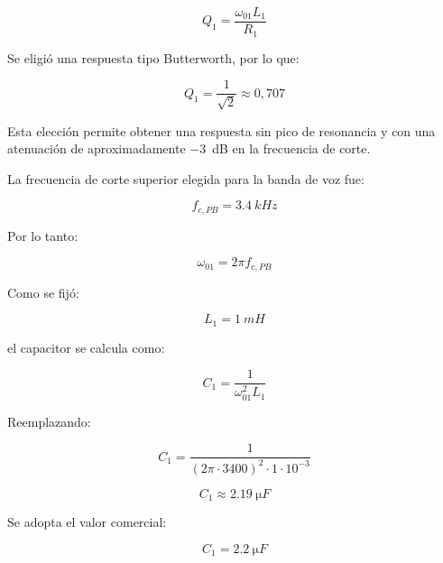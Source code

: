 \documentclass[12pt,a4paper]{article}
\begin{document}
\begin{equation}
    \boxed{
    Q_1=\frac{\omega_{01}L_1}{R_1}
    }
    \label{eq:q1}
\end{equation}

Se eligió una respuesta tipo Butterworth, por lo que:

\begin{equation}
    Q_1=\frac{1}{\sqrt{2}}\approx 0{,}707
    \label{eq:q_butterworth_pb}
\end{equation}

Esta elección permite obtener una respuesta sin pico de resonancia y con una atenuación de aproximadamente \SI{-3}{dB} en la frecuencia de corte.

La frecuencia de corte superior elegida para la banda de voz fue:

\begin{equation}
    f_{c,PB}=\SI{3.4}{kHz}
    \label{eq:fc_pb}
\end{equation}

Por lo tanto:

\begin{equation}
    \omega_{01}=2\pi f_{c,PB}
    \label{eq:w01_fc}
\end{equation}

Como se fijó:

\begin{equation}
    L_1=\SI{1}{mH}
    \label{eq:l1_valor}
\end{equation}

el capacitor se calcula como:

\begin{equation}
    C_1=
    \frac{1}{\omega_{01}^2L_1}
    \label{eq:c1_calculo}
\end{equation}

Reemplazando:

\begin{equation}
    C_1=
    \frac{1}
    {(2\pi\cdot 3400)^2\cdot 1\cdot 10^{-3}}
    \label{eq:c1_reemplazo}
\end{equation}

\begin{equation}
    \boxed{
    C_1\approx \SI{2.19}{\micro F}
    }
    \label{eq:c1_resultado}
\end{equation}

Se adopta el valor comercial:

\begin{equation}
    \boxed{
    C_1=\SI{2.2}{\micro F}
    }
    \label{eq:c1_comercial}
\end{equation}
\end{document}
